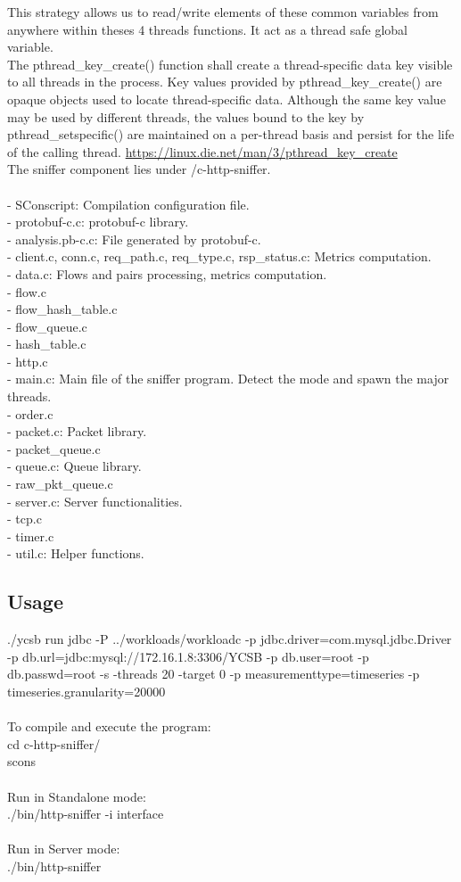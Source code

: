 \documentclass[12pt,hidelinks]{article}
\begin{document}
This strategy allows us to read/write elements of these common variables from anywhere within theses 4 threads functions. It act as a thread safe global variable.
\\
The pthread\_key\_create() function shall create a thread-specific data key visible to all threads in the process. 
Key values provided by pthread\_key\_create() are opaque objects used to locate thread-specific data. 
Although the same key value may be used by different threads, the values bound to the key by pthread\_setspecific() are maintained on a per-thread basis and persist for the life of the calling thread.
\url{https://linux.die.net/man/3/pthread_key_create}
\\
The sniffer component lies under /c-http-sniffer. \\
\\
- SConscript: Compilation configuration file. \\
- protobuf-c.c: protobuf-c library. \\
- analysis.pb-c.c: File generated by protobuf-c. \\
- client.c, conn.c, req\_path.c, req\_type.c, rsp\_status.c: Metrics computation. \\
- data.c: Flows and pairs processing, metrics computation.\\
- flow.c \\
- flow\_hash\_table.c \\
- flow\_queue.c \\
- hash\_table.c \\
- http.c \\
- main.c: Main file of the sniffer program. Detect the mode and spawn the major threads. \\
- order.c \\
- packet.c: Packet library. \\
- packet\_queue.c \\
- queue.c: Queue library. \\
- raw\_pkt\_queue.c \\
- server.c: Server functionalities. \\
- tcp.c \\
- timer.c \\
- util.c: Helper functions.

\subsection{Usage}
./ycsb run jdbc
-P ../workloads/workloadc
-p jdbc.driver=com.mysql.jdbc.Driver
-p db.url=jdbc:mysql://172.16.1.8:3306/YCSB
-p db.user=root
-p db.passwd=root
-s
-threads 20
-target 0
-p measurementtype=timeseries
-p timeseries.granularity=20000 \\
\\
To compile and execute the program: \\
cd c-http-sniffer/ \\
scons \\
\\
Run in Standalone mode: \\
./bin/http-sniffer -i interface \\
\\
Run in Server mode: \\
./bin/http-sniffer 
\end{document}
